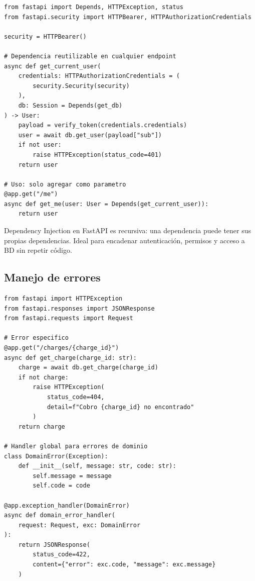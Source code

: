 \documentclass[11pt,a4paper]{article}
\begin{document}
\begin{pybox}
\begin{lstlisting}[style=python]
from fastapi import Depends, HTTPException, status
from fastapi.security import HTTPBearer, HTTPAuthorizationCredentials

security = HTTPBearer()

# Dependencia reutilizable en cualquier endpoint
async def get_current_user(
    credentials: HTTPAuthorizationCredentials = (
        security.Security(security)
    ),
    db: Session = Depends(get_db)
) -> User:
    payload = verify_token(credentials.credentials)
    user = await db.get_user(payload["sub"])
    if not user:
        raise HTTPException(status_code=401)
    return user

# Uso: solo agregar como parametro
@app.get("/me")
async def get_me(user: User = Depends(get_current_user)):
    return user
\end{lstlisting}
\end{pybox}

\begin{tipbox}
Dependency Injection en FastAPI es recursiva: una dependencia puede
tener sus propias dependencias. Ideal para encadenar autenticación,
permisos y acceso a BD sin repetir código.
\end{tipbox}

\subsection{Manejo de errores}

\begin{pybox}
\begin{lstlisting}[style=python]
from fastapi import HTTPException
from fastapi.responses import JSONResponse
from fastapi.requests import Request

# Error especifico
@app.get("/charges/{charge_id}")
async def get_charge(charge_id: str):
    charge = await db.get_charge(charge_id)
    if not charge:
        raise HTTPException(
            status_code=404,
            detail=f"Cobro {charge_id} no encontrado"
        )
    return charge

# Handler global para errores de dominio
class DomainError(Exception):
    def __init__(self, message: str, code: str):
        self.message = message
        self.code = code

@app.exception_handler(DomainError)
async def domain_error_handler(
    request: Request, exc: DomainError
):
    return JSONResponse(
        status_code=422,
        content={"error": exc.code, "message": exc.message}
    )
\end{lstlisting}
\end{pybox}
\end{document}
